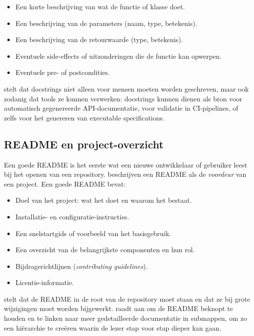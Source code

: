 \begin{itemize}
    \item Een korte beschrijving van wat de functie of klasse doet.
    \item Een beschrijving van de parameters (naam, type, betekenis).
    \item Een beschrijving van de retourwaarde (type, betekenis).
    \item Eventuele side-effects of uitzonderingen die de functie kan opwerpen.
    \item Eventuele pre- of postcondities.
\end{itemize}

\textcite{martraire2019livingdocumentation} stelt dat docstrings niet alleen voor mensen moeten worden geschreven, maar ook zodanig dat tools ze kunnen verwerken: docstrings kunnen dienen als bron voor automatisch gegenereerde API-documentatie, voor validatie in CI-pipelines, of zelfs voor het genereren van executable specifications.

\subsection{README en project-overzicht}
Een goede README is het eerste wat een nieuwe ontwikkelaar of gebruiker leest bij het openen van een repository. \textcite{bhatti2021docsdevelopers} beschrijven een README als de \textit{voordeur} van een project. Een goede README bevat:

\begin{itemize}
    \item Doel van het project: wat het doet en waarom het bestaat.
    \item Installatie- en configuratie-instructies.
    \item Een snelstartgids of voorbeeld van het basisgebruik.
    \item Een overzicht van de belangrijkste componenten en hun rol.
    \item Bijdragerichtlijnen (\textit{contributing guidelines}).
    \item Licentie-informatie.
\end{itemize}

\textcite{gentle2017docslikecode} stelt dat de README in de root van de repository moet staan en dat ze bij grote wijzigingen moet worden bijgewerkt. \textcite{etter2016moderntechwriting} raadt aan om de README beknopt te houden en te linken naar meer gedetailleerde documentatie in submappen, om zo een hiërarchie te creëren waarin de lezer stap voor stap dieper kan gaan.

